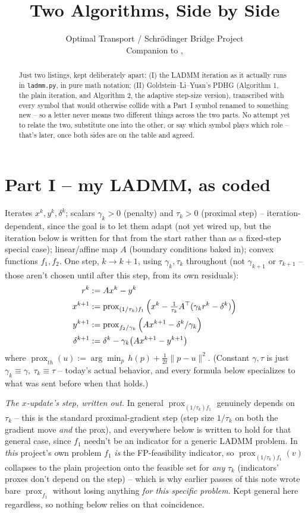 \documentclass[11pt]{article}
\title{Two Algorithms, Side by Side}
\author{Optimal Transport / Schr\"odinger Bridge Project\\
Companion to \code{nonuniform\_grid\_xy\_variables.tex}, \code{nonuniform\_grid\_norms.tex}}
\date{}
\newcommand{\code}[1]{\texttt{#1}}
\newcommand{\prox}{\operatorname{prox}}
\begin{document}
\maketitle

\begin{abstract}
Just two listings, kept deliberately apart: (I) the LADMM iteration as it actually runs in
\code{ladmm.py}, in pure math notation; (II) Goldstein--Li--Yuan's PDHG (Algorithm 1, the
plain iteration, and Algorithm 2, the adaptive step-size version), transcribed with every
symbol that would otherwise collide with a Part~I symbol renamed to something new -- so a
letter never means two different things across the two parts. No attempt yet to relate the
two, substitute one into the other, or say which symbol plays which role -- that's later,
once both sides are on the table and agreed.
\end{abstract}

\section*{Part I -- my LADMM, as coded}
Iterates $x^k,y^k,\delta^k$; scalars $\gamma_k>0$ (penalty) and $\tau_k>0$ (proximal
step) -- iteration-dependent, since the goal is to let them adapt (not yet wired up, but
the iteration below is written for that from the start rather than as a fixed-step
special case); linear/affine map $A$ (boundary conditions baked in); convex functions
$f_1,f_2$. One step, $k\to k+1$, using $\gamma_k,\tau_k$ throughout (not $\gamma_{k+1}$
or $\tau_{k+1}$ -- those aren't chosen until after this step, from its own residuals):
\begin{align}
r^k &:= Ax^k - y^k \notag\\
x^{k+1} &:= \prox_{(1/\tau_k)f_1}\Big(x^k - \tfrac1{\tau_k} A^\top(\gamma_k r^k - \delta^k)\Big) \notag\\
y^{k+1} &:= \prox_{f_2/\gamma_k}\Big(Ax^{k+1} - \delta^k/\gamma_k\Big) \notag\\
\delta^{k+1} &:= \delta^k - \gamma_k\big(Ax^{k+1}-y^{k+1}\big) \notag
\end{align}
where $\prox_{th}(u):=\arg\min_p\, h(p)+\tfrac1{2t}\|p-u\|^2$. (Constant $\gamma,\tau$ is
just $\gamma_k\equiv\gamma,\ \tau_k\equiv\tau$ -- today's actual behavior, and every
formula below specializes to what was sent before when that holds.)

\emph{The $x$-update's step, written out.} In general $\prox_{(1/\tau_k)f_1}$ genuinely
depends on $\tau_k$ -- this is the standard proximal-gradient step (step size $1/\tau_k$
on both the gradient move \emph{and} the prox), and everywhere below is written to hold
for that general case, since $f_1$ needn't be an indicator for a generic LADMM problem.
In \emph{this} project's own problem $f_1$ \emph{is} the FP-feasibility indicator, so
$\prox_{(1/\tau_k)f_1}(v)$ collapses to the plain projection onto the feasible set for
\emph{any} $\tau_k$ (indicators' proxes don't depend on the step) -- which is why earlier
passes of this note wrote bare $\prox_{f_1}$ without losing anything \emph{for this
specific problem}. Kept general here regardless, so nothing below relies on that
coincidence.
\end{document}
